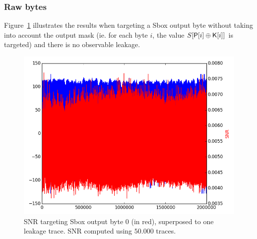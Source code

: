 \subsubsection{Raw bytes}
Figure~\ref{fig:SNR_S0} illustrates the results when targeting a Sbox output byte without taking into account the output mask (ie. for each byte $i$, the value $S[\mathsf{P}[i]\oplus \mathsf{K}[i]]$ is targeted) and there is no observable leakage.
\begin{figure}[H]
	\centering 
	\includegraphics[scale=0.35]{figures/2Mpts/SNR_raw_S0_50ktraces.png}
	\caption{SNR targeting Sbox output byte 0 (in red), superposed to one leakage trace. SNR computed using $50.000$ traces.}
	\label{fig:SNR_S0}
\end{figure}

